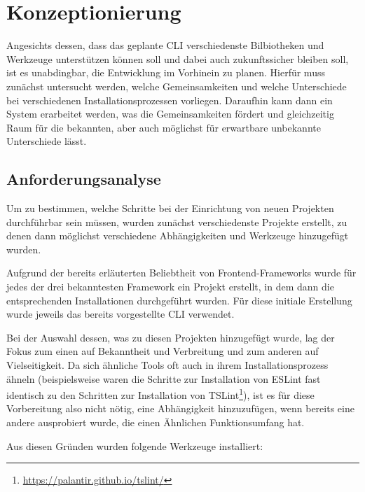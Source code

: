 \section{Konzeptionierung}
Angesichts dessen, dass das geplante \gls{CLI} verschiedenste Bilbiotheken und Werkzeuge unterstützen können soll und dabei auch zukunftssicher bleiben soll, ist es unabdingbar, die Entwicklung im Vorhinein zu planen. Hierfür muss zunächst untersucht werden, welche Gemeinsamkeiten und welche Unterschiede bei verschiedenen Installationsprozessen vorliegen. Daraufhin kann dann ein System erarbeitet werden, was die Gemeinsamkeiten fördert und gleichzeitig Raum für die bekannten, aber auch möglichst für erwartbare unbekannte Unterschiede lässt.

\subsection{Anforderungsanalyse}
Um zu bestimmen, welche Schritte bei der Einrichtung von neuen Projekten durchführbar sein müssen, wurden zunächst verschiedenste Projekte erstellt, zu denen dann möglichst verschiedene Abhängigkeiten und Werkzeuge hinzugefügt wurden.

Aufgrund der bereits erläuterten Beliebtheit von Frontend-Frameworks wurde für jedes der drei bekanntesten Framework ein Projekt erstellt, in dem dann die entsprechenden Installationen durchgeführt wurden. Für diese initiale Erstellung wurde jeweils das bereits vorgestellte \gls{CLI} verwendet.

Bei der Auswahl dessen, was zu diesen Projekten hinzugefügt wurde, lag der Fokus zum einen auf Bekanntheit und Verbreitung und zum anderen auf Vielseitigkeit. Da sich ähnliche Tools oft auch in ihrem Installationsprozess ähneln (beispielsweise waren die Schritte zur Installation von ESLint fast identisch zu den Schritten zur Installation von TSLint\footnote{\url{https://palantir.github.io/tslint/}}), ist es für diese Vorbereitung also nicht nötig, eine Abhängigkeit hinzuzufügen, wenn bereits eine andere ausprobiert wurde, die einen Ähnlichen Funktionsumfang hat.

Aus diesen Gründen wurden folgende Werkzeuge installiert:

